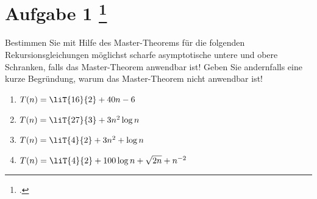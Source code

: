 \documentclass{lehramt-informatik-aufgabe}
\begin{document}
\let\T=\liT

\liAufgabenTitel{}
\section{Aufgabe 1
\footcite{66115:2011:03}}

Bestimmen Sie mit Hilfe des Master-Theorems für die folgenden
Rekursionsgleichungen möglichst scharfe asymptotische untere und obere
Schranken, falls das Master-Theorem anwendbar ist! Geben Sie andernfalls
eine kurze Begründung, warum das Master-Theorem nicht anwendbar ist!

\begin{enumerate}

\item $T(n) = \T{16}{2} + 40n - 6$


\item $T(n) = \T{27}{3} + 3n^2 \log n$


\item $T(n) = \T{4}{2} + 3n^2 + \log n$


\item $T(n)= \T{4}{2} + 100 \log n + \sqrt{2n} + n^{-2}$
\end{enumerate}
\end{document}
